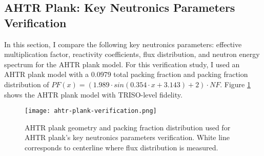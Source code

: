 \subsection{AHTR Plank: Key Neutronics Parameters Verification}
\label{sec:plank-knp}
In this section, I compare the following key neutronics parameters: effective 
multiplication factor, reactivity coefficients, flux distribution, and neutron energy 
spectrum for the \gls{AHTR} plank model. 
For this verification study, I used an AHTR plank model with a 0.0979 total packing fraction and 
packing fraction distribution of $PF(x) = \left(1.989\cdot sin(0.354\cdot x + 3.143) + 2\right) \cdot NF$. 
Figure \ref{fig:ahtr-plank-verification} shows the AHTR plank model with TRISO-level 
fidelity.
 \begin{figure}[htbp]
    \centering
    \texttt{[image: ahtr-plank-verification.png]}
    \raggedright
    \caption{\acrfull{AHTR} plank geometry and packing fraction distribution used for 
    \gls{AHTR} plank's key neutronics parameters verification. 
    White line corresponds to centerline where flux distribution is measured. }  
    \label{fig:ahtr-plank-verification}
\end{figure}

